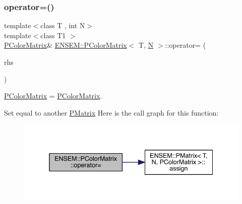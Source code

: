 \subsubsection{\texorpdfstring{operator=()}{operator=()}\hspace{0.1cm}{\footnotesize\ttfamily [5/6]}}
{\footnotesize\ttfamily template$<$class T , int N$>$ \\
template$<$class T1 $>$ \\
\mbox{\hyperlink{classENSEM_1_1PColorMatrix}{P\+Color\+Matrix}}\& \mbox{\hyperlink{classENSEM_1_1PColorMatrix}{E\+N\+S\+E\+M\+::\+P\+Color\+Matrix}}$<$ T, \mbox{\hyperlink{adat__devel_2lib_2hadron_2operator__name__util_8cc_a7722c8ecbb62d99aee7ce68b1752f337}{N}} $>$\+::operator= (\begin{DoxyParamCaption}\item[{const \mbox{\hyperlink{classENSEM_1_1PColorMatrix}{P\+Color\+Matrix}}$<$ T1, \mbox{\hyperlink{adat__devel_2lib_2hadron_2operator__name__util_8cc_a7722c8ecbb62d99aee7ce68b1752f337}{N}} $>$ \&}]{rhs }\end{DoxyParamCaption})\hspace{0.3cm}{\ttfamily [inline]}}



\mbox{\hyperlink{classENSEM_1_1PColorMatrix}{P\+Color\+Matrix}} = \mbox{\hyperlink{classENSEM_1_1PColorMatrix}{P\+Color\+Matrix}}. 

Set equal to another \mbox{\hyperlink{classENSEM_1_1PMatrix}{P\+Matrix}} Here is the call graph for this function\+:
\nopagebreak
\begin{figure}[H]
\begin{center}
\leavevmode
\includegraphics[width=338pt]{d8/d21/classENSEM_1_1PColorMatrix_a529b6a2c63f2087a6a336af14b6f80eb_cgraph}
\end{center}
\end{figure}
\mbox{\label{classENSEM_1_1PColorMatrix_a529b6a2c63f2087a6a336af14b6f80eb}} 
